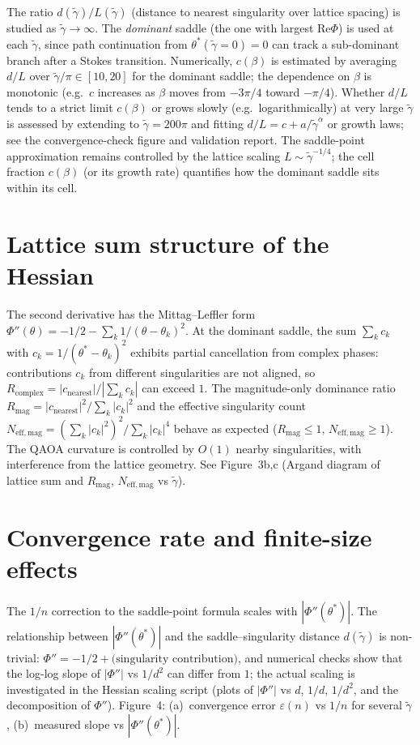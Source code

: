 \documentclass[11pt]{article}
\begin{document}
The ratio $d(\tilde{\gamma})/L(\tilde{\gamma})$ (distance to nearest singularity over lattice spacing) is studied as $\tilde{\gamma} \to \infty$. The \emph{dominant} saddle (the one with largest Re$\Phi$) is used at each $\tilde{\gamma}$, since path continuation from $\theta^*(\tilde{\gamma}=0)=0$ can track a sub-dominant branch after a Stokes transition. Numerically, $c(\beta)$ is estimated by averaging $d/L$ over $\tilde{\gamma}/\pi \in [10, 20]$ for the dominant saddle; the dependence on $\beta$ is monotonic (e.g.\ $c$ increases as $\beta$ moves from $-3\pi/4$ toward $-\pi/4$). Whether $d/L$ tends to a strict limit $c(\beta)$ or grows slowly (e.g.\ logarithmically) at very large $\tilde{\gamma}$ is assessed by extending to $\tilde{\gamma} = 200\pi$ and fitting $d/L = c + a/\tilde{\gamma}^\alpha$ or growth laws; see the convergence-check figure and validation report. The saddle-point approximation remains controlled by the lattice scaling $L \sim \tilde{\gamma}^{-1/4}$; the cell fraction $c(\beta)$ (or its growth rate) quantifies how the dominant saddle sits within its cell.

\section{Lattice sum structure of the Hessian}

The second derivative has the Mittag--Leffler form $\Phi''(\theta) = -1/2 - \sum_k 1/(\theta - \theta_k)^2$. At the dominant saddle, the sum $\sum_k c_k$ with $c_k = 1/(\theta^* - \theta_k)^2$ exhibits partial cancellation from complex phases: contributions $c_k$ from different singularities are not aligned, so $R_{\mathrm{complex}} = |c_{\mathrm{nearest}}|/|\sum_k c_k|$ can exceed $1$. The magnitude-only dominance ratio $R_{\mathrm{mag}} = |c_{\mathrm{nearest}}|^2/\sum_k |c_k|^2$ and the effective singularity count $N_{\mathrm{eff,mag}} = (\sum_k |c_k|^2)^2/\sum_k |c_k|^4$ behave as expected ($R_{\mathrm{mag}} \le 1$, $N_{\mathrm{eff,mag}} \ge 1$). The QAOA curvature is controlled by $O(1)$ nearby singularities, with interference from the lattice geometry. See Figure~3b,c (Argand diagram of lattice sum and $R_{\mathrm{mag}}$, $N_{\mathrm{eff,mag}}$ vs $\tilde{\gamma}$).

\section{Convergence rate and finite-size effects}

The $1/n$ correction to the saddle-point formula scales with $|\Phi''(\theta^*)|$. The relationship between $|\Phi''(\theta^*)|$ and the saddle--singularity distance $d(\tilde{\gamma})$ is non-trivial: $\Phi'' = -1/2 + \text{(singularity contribution)}$, and numerical checks show that the log-log slope of $|\Phi''|$ vs $1/d^2$ can differ from $1$; the actual scaling is investigated in the Hessian scaling script (plots of $|\Phi''|$ vs $d$, $1/d$, $1/d^2$, and the decomposition of $\Phi''$). Figure~4: (a)~convergence error $\varepsilon(n)$ vs $1/n$ for several $\tilde{\gamma}$, (b)~measured slope vs $|\Phi''(\theta^*)|$.
\end{document}

